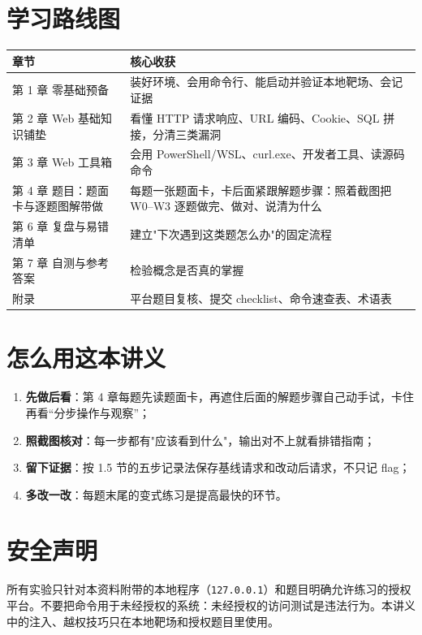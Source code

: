 \documentclass[UTF8,12pt,oneside]{ctexbook}
\begin{document}
\section*{学习路线图}
\begin{center}
\begin{tabular}{p{}p{}}
\toprule
章节 & 核心收获 \\
\midrule
第 1 章 零基础预备 & 装好环境、会用命令行、能启动并验证本地靶场、会记证据 \\
第 2 章 Web 基础知识铺垫 & 看懂 HTTP 请求响应、URL 编码、Cookie、SQL 拼接，分清三类漏洞 \\
第 3 章 Web 工具箱 & 会用 PowerShell/WSL、curl.exe、开发者工具、读源码命令 \\
第 4 章 题目：题面卡与逐题图解带做 & 每题一张题面卡，卡后面紧跟解题步骤：照着截图把 W0--W3 逐题做完、做对、说清为什么 \\
第 6 章 复盘与易错清单 & 建立"下次遇到这类题怎么办"的固定流程 \\
第 7 章 自测与参考答案 & 检验概念是否真的掌握 \\
附录 & 平台题目复核、提交 checklist、命令速查表、术语表 \\
\bottomrule
\end{tabular}
\end{center}

\section*{怎么用这本讲义}
\begin{enumerate}
\item \textbf{先做后看}：第 4 章每题先读题面卡，再遮住后面的解题步骤自己动手试，卡住再看“分步操作与观察”；
\item \textbf{照截图核对}：每一步都有"应该看到什么"，输出对不上就看排错指南；
\item \textbf{留下证据}：按 1.5 节的五步记录法保存基线请求和改动后请求，不只记 flag；
\item \textbf{多改一改}：每题末尾的变式练习是提高最快的环节。
\end{enumerate}

\section*{安全声明}
所有实验只针对本资料附带的本地程序（\verb|127.0.0.1|）和题目明确允许练习的授权平台。不要把命令用于未经授权的系统：未经授权的访问测试是违法行为。本讲义中的注入、越权技巧只在本地靶场和授权题目里使用。
\end{document}
